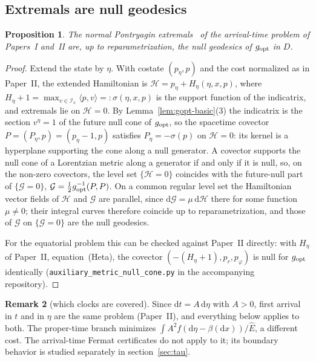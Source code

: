 \documentclass[aip,jmp,amsmath,amssymb,reprint]{revtex4-2}
\newcommand{\Ehat}{\hat E}
\newcommand{\dd}{\mathrm{d}}
\newcommand{\gopt}{g_{\rm opt}}
\theoremstyle{plain}
\newtheorem{proposition}{Proposition}[section]
\theoremstyle{definition}
\newtheorem{remark}[proposition]{Remark}
\begin{document}
\subsection{Extremals are null geodesics}
\begin{proposition}\label{prop:extremals}
The normal Pontryagin extremals~\cite[section~4.1]{Liberzon} of the arrival-time problem of Papers~I and~II are, up
to reparametrization, the null geodesics of $\gopt$ in $D$.
\end{proposition}

\begin{proof}
Extend the state by $\eta$. With costate $(p_\eta,p)$ and the cost normalized as in
Paper~II, the extended Hamiltonian is $\mathcal H=p_\eta+H_\eta(\eta,x,p)$, where
$H_\eta+1=\max_{v\in\mathcal I_x}\langle p,v\rangle=:\sigma(\eta,x,p)$ is the support
function of the indicatrix, and extremals lie on $\mathcal H=0$. By
Lemma~\ref{lem:gopt-basic}(3) the indicatrix is the section $v^\eta=1$ of the future
null cone of $\gopt$, so the spacetime covector
$P=(P_\eta,p)=(p_\eta-1,p)$ satisfies $P_\eta=-\sigma(p)$ on $\mathcal H=0$: its kernel
is a hyperplane supporting the cone along a null generator. A covector supports the
null cone of a Lorentzian metric along a generator if and only if it is null, so, on the non-zero covectors, the level set $\{\mathcal H=0\}$ coincides with the future-null part of
$\{\mathcal G=0\}$, $\mathcal G=\frac12\gopt^{-1}(P,P)$. On a common regular level set the
Hamiltonian vector fields of $\mathcal H$ and $\mathcal G$ are parallel, since
$\dd\mathcal G=\mu\,\dd\mathcal H$ there for some function $\mu\neq0$; their integral curves
therefore coincide up to reparametrization, and those of $\mathcal G$ on
$\{\mathcal G=0\}$ are the null geodesics.

For the equatorial problem this can be checked against Paper~II directly: with
$H_\eta$ of Paper~II, equation~(Heta), the covector $(-(H_\eta+1),p_r,p_\varphi)$ is null
for $\gopt$ identically (\texttt{auxiliary\_metric\_null\_cone.py} in the accompanying repository).
\end{proof}

\begin{remark}[which clocks are covered]\label{rmk:clocks}
Since $\dd t=A\,\dd\eta$ with $A>0$, first arrival in $t$ and in $\eta$ are the same
problem (Paper~II), and everything below applies to both. The proper-time branch
minimizes $\int A^2f(\dd\eta-\beta(\dd x))/\Ehat$, a different cost. The arrival-time
Fermat certificates do not apply to it; its boundary behavior is studied separately in
section~\ref{sec:tau}.
\end{remark}
\end{document}
